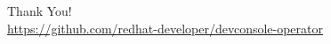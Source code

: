 \documentclass[aspectratio=169]{beamer}
\begin{document}
















\begin{frame}
  \begin{center}
    {\huge Thank You!}\\[1cm]
    \url{https://github.com/redhat-developer/devconsole-operator}
  \end{center}
\end{frame}
\end{document}
